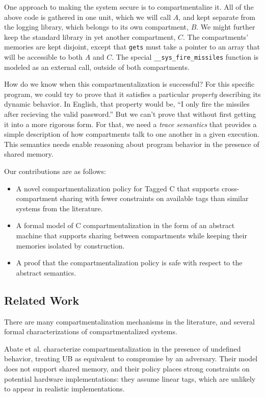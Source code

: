 One approach to making the system secure is to compartmentalize it. All of the above code
is gathered in one unit, which we will call \(A\), and kept separate from the logging library,
which belongs to its own compartment, \(B\). We might further keep the standard library in yet
another compartment, \(C\). The compartments' memories are kept disjoint, except that {\tt gets}
must take a pointer to an array that will be accessible to both \(A\) and \(C\).
The special {\tt \_\_sys\_fire\_missiles} function is modeled as an external call,
outside of both compartments.

How do we know when this compartmentalization is successful? For this specific program,
we could try to prove that it satisfies a particular {\em property} describing its dynamic behavior.
In English, that property would be, ``I only fire the missiles after recieving the valid password.''
But we can't prove that without first getting it into a more rigorous form. For that, we
need a {\em trace semantics} that provides a simple description of how compartments talk to
one another in a given execution. This semantics needs enable reasoning about program behavior
in the presence of shared memory.

Our contributions are as follows:
\begin{itemize}
\item A novel compartmentalization policy for Tagged C that supports cross-compartment
  sharing with fewer constraints on available tags than similar systems from the literature.
\item A formal model of C compartmentalization in the form of an abstract machine that
  supports sharing between compartments while keeping their memories isolated by construction.
\item A proof that the compartmentalization policy is safe with respect to the abstract semantics.
\end{itemize}

\subsection{Related Work}

There are many compartmentalization mechanisms in the literature, and several formal
characterizations of compartmentalized systems.

Abate et al. \cite{Abate18:GoodComponentsBad} characterize compartmentalization in the
presence of undefined behavior, treating UB as equivalent to compromise by an adversary.
Their model does not support shared memory, and their policy places strong constraints on potential
hardware implementations: they assume linear tags, which are unlikely to appear
in realistic implementations.

